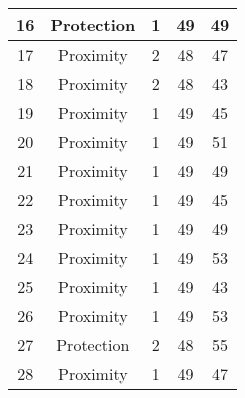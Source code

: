 \documentclass[results.tex]{subfiles}
\begin{document}
\begin{center}
\begin{tabular}{| c || c | c | c | c |}
            \hline
            16                      & Protection                   & 1                      & 49                      & 49                   \\
            \hline
            17                      & Proximity                    & 2                      & 48                      & 47                   \\
            \hline
            18                      & Proximity                    & 2                      & 48                      & 43                   \\
            \hline
            19                      & Proximity                    & 1                      & 49                      & 45                   \\
            \hline
            20                      & Proximity                    & 1                      & 49                      & 51                   \\
            \hline
            21                      & Proximity                    & 1                      & 49                      & 49                   \\
            \hline
            22                      & Proximity                    & 1                      & 49                      & 45                   \\
            \hline
            23                      & Proximity                    & 1                      & 49                      & 49                   \\
            \hline
            24                      & Proximity                    & 1                      & 49                      & 53                   \\
            \hline
            25                      & Proximity                    & 1                      & 49                      & 43                   \\
            \hline
            26                      & Proximity                    & 1                      & 49                      & 53                   \\
            \hline
            27                      & Protection                   & 2                      & 48                      & 55                   \\
            \hline
            28                      & Proximity                    & 1                      & 49                      & 47                   \\

\end{tabular}
\end{center}
\end{document}
